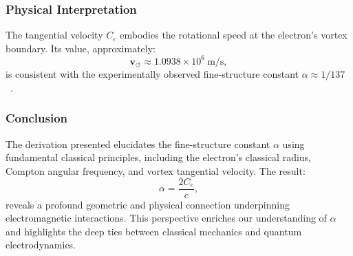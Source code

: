 \subsubsection*{Physical Interpretation}
The tangential velocity $C_e$ embodies the rotational speed at the electron's vortex boundary. Its value, approximately:
\begin{equation*}
    \mathbf{v}_{\scriptscriptstyle\boldsymbol{\circlearrowleft}} \approx 1.0938 \times 10^6 \ \text{m/s},
\end{equation*}
is consistent with the experimentally observed fine-structure constant $\alpha \approx 1/137$~\cite{ricca1998}.

\subsubsection*{Conclusion}
The derivation presented elucidates the fine-structure constant $\alpha$ using fundamental classical principles, including the electron's classical radius, Compton angular frequency, and vortex tangential velocity. The result:
\begin{equation*}
    \alpha = \frac{2 C_e}{c},
\end{equation*}
reveals a profound geometric and physical connection underpinning electromagnetic interactions.
This perspective enriches our understanding of $\alpha$ and highlights the deep ties between classical mechanics and quantum electrodynamics.